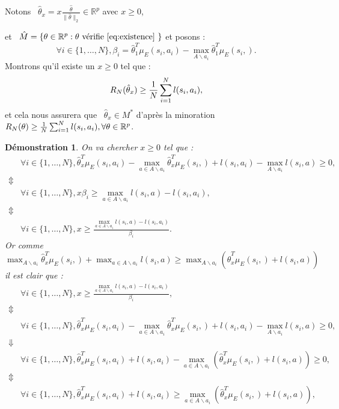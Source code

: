 \documentclass[publibook-draft]{CAp2012}
\newtheorem{preuve}{Démonstration}
\begin{document}
Notons ~$\hat{\theta}_x=x\frac{\hat{\theta}}{\|\hat{\theta}\|_2}\in\mathbb{R}^p$ avec $x\geq0$,{ et ~$\hat{M}=\{\theta\in\mathbb{R}^p:\theta \text{ vérifie \ref{eq:existence} }  \}$ et posons :
\begin{equation}
\forall i\in\{1,\dots,N\}, \beta_i=\hat{\theta}_1^T\mu_E(s_i,a_i)-\max_{A \backslash a_i}\hat{\theta}_1^T\mu_E(s_i,).
\end{equation}
Montrons qu'il existe un $x\geq0$ tel que :
\begin{equation}
R_N(\hat{\theta}_x)\geq {1\over N} \sum_{i=1}^N l(s_i,a_i),
\end{equation}
et cela nous assurera que ~$\hat{\theta}_x\in M^*$ d'après la minoration  ~$R_N(\theta)\geq {1\over N} \sum_{i=1}^Nl(s_i,a_i), \forall \theta\in\mathbb{R}^p$.
\begin{preuve}
On va chercher $x\geq0$ tel que :
\begin{align}
&\forall i\in\{1,\dots,N\}, \hat{\theta}_x^T\mu_E(s_i,a_i)-\max_{a\in A \backslash a_i}\hat{\theta}_x^T\mu_E(s_i,) + l(s_i,a_i)-\max_{A \backslash a_i}l(s_i,a)\geq0,
\\
\Updownarrow
\\
&\forall i\in\{1,\dots,N\}, x\beta_i \geq\max_{a\in A \backslash a_i}l(s_i,a)-l(s_i,a_i),
\\
\Updownarrow
\\
&\forall i\in\{1,\dots,N\}, x\geq\frac{\max_{a\in A \backslash a_i}l(s_i,a)-l(s_i,a_i)}{\beta_i}.
\end{align}
Or comme ~$\max_{A \backslash a_i}\hat{\theta}_x^T\mu_E(s_i,)+\max_{a\in A \backslash a_i}l(s_i,a)\geq\max_{A \backslash a_i}(\hat{\theta}_x^T\mu_E(s_i,)+l(s_i,a))$ il est clair que :
\begin{align}
&\forall i\in\{1,\dots,N\}, x\geq\frac{\max_{a\in A \backslash a_i}l(s_i,a)-l(s_i,a_i)}{\beta_i},
\\
\Updownarrow
\\
&\forall i\in\{1,\dots,N\}, \hat{\theta}_x^T\mu_E(s_i,a_i)-\max_{a \in A \backslash a_i}\hat{\theta}_x^T\mu_E(s_i,) + l(s_i,a_i)-\max_{A \backslash a_i}l(s_i,a)\geq0,
\\
\Downarrow
\\
&\forall i\in\{1,\dots,N\}, \hat{\theta}_x^T\mu_E(s_i,a_i) + l(s_i,a_i)-\max_{a \in A  \backslash a_i}(\hat{\theta}_x^T\mu_E(s_i,)+l(s_i,a))\geq0,
\\
\Updownarrow
\\
&\forall i\in\{1,\dots,N\}, \hat{\theta}_x^T\mu_E(s_i,a_i) + l(s_i,a_i)\geq\max_{a \in A \backslash a_i}(\hat{\theta}_x^T\mu_E(s_i,)+l(s_i,a)),

\end{align}
\end{preuve}}
\end{document}
